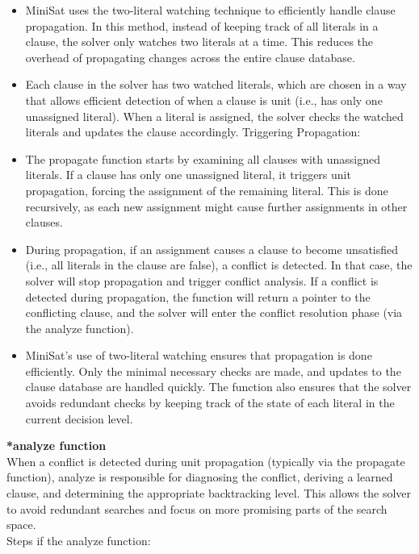 \documentclass[runningheads]{llncs}
\begin{document}
\begin{itemize}
\item MiniSat uses the two-literal watching technique to efficiently handle clause propagation. In this method, instead of keeping track of all literals in a clause, the solver only watches two literals at a time. This reduces the overhead of propagating changes across the entire clause database.
\item Each clause in the solver has two watched literals, which are chosen in a way that allows efficient detection of when a clause is unit (i.e., has only one unassigned literal). When a literal is assigned, the solver checks the watched literals and updates the clause accordingly.
Triggering Propagation:

\item The propagate function starts by examining all clauses with unassigned literals. If a clause has only one unassigned literal, it triggers unit propagation, forcing the assignment of the remaining literal. This is done recursively, as each new assignment might cause further assignments in other clauses.

\item During propagation, if an assignment causes a clause to become unsatisfied (i.e., all literals in the clause are false), a conflict is detected. In that case, the solver will stop propagation and trigger conflict analysis. If a conflict is detected during propagation, the function will return a pointer to the conflicting clause, and the solver will enter the conflict resolution phase (via the analyze function).

\item MiniSat's use of two-literal watching ensures that propagation is done efficiently. Only the minimal necessary checks are made, and updates to the clause database are handled quickly.
The function also ensures that the solver avoids redundant checks by keeping track of the state of each literal in the current decision level.
\end{itemize}
\textbf{*analyze function}
\\
When a conflict is detected during unit propagation (typically via the propagate function), analyze is responsible for diagnosing the conflict, deriving a learned clause, and determining the appropriate backtracking level. This allows the solver to avoid redundant searches and focus on more promising parts of the search space. 
\\
Steps if the analyze function:
\end{document}
